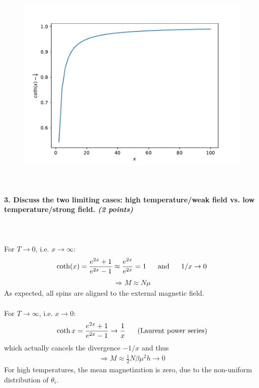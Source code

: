     \begin{figure}[h!]
        \centering
        \includegraphics[width=.6\textwidth]{./figures/magnetization.pdf}
    \end{figure} \ \\ 

\paragraph{3. Discuss the two limiting cases: 
    high temperature/weak field vs. 
    low temperature/strong field.
    \textit{(2 points)}
} \ \\
    \\
    For $T\to0$, i.e. $x\to\infty$: 
    \begin{align}
        \coth(x)=\frac{e^{2x}+1}{e^{2x}-1}
        \approx\frac{e^{2x}}{e^{2x}}=1
        \ \ \ \ \ \textnormal{and}\ \ \ \ \
        1/x\to0
    \end{align}
    \begin{align}
        \Rightarrow
        M\approx N\mu 
    \end{align}
    As expected, all spins are aligned to 
    the external magnetic field. \\ 
    \\
    For $T\to\infty$, i.e. $x\to0$: \\
    \begin{align}
        \coth x=\frac{e^{2x}+1}{e^{2x}-1}
        \to\frac{1}{x}
        \ \ \ \ \ \textnormal{(Laurent power series)}
    \end{align}
    which actually cancels the divergence $-1/x$ and thus
    \begin{align}
        \Rightarrow
        M\approx
        \frac{1}{2}N\beta\mu^2 h\to0
    \end{align}
    For high temperatures, the mean 
    magnetization is zero, due to the 
    non-uniform distribution of $\theta_i$.
